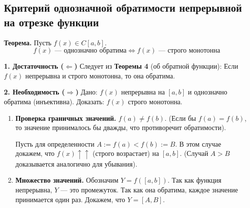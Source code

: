 \subsection{Критерий однозначной обратимости непрерывной на отрезке функции}

\textbf{Теорема.} Пусть $f(x) \in C[a, b]$.
\[ f(x) \text{ — однозначно обратима} \iff f(x) \text{ — строго монотонна} \]

\begin{tcolorbox}[title=Доказательство]
    \textbf{1. Достаточность ($\Leftarrow$)}
    Следует из \textbf{Теоремы 4} (об обратной функции):
    Если $f(x)$ непрерывна и строго монотонна, то она обратима.

    \textbf{2. Необходимость ($\Rightarrow$)}
    Дано: $f(x)$ непрерывна на $[a, b]$ и однозначно обратима (инъективна).
    Доказать: $f(x)$ строго монотонна.

    \begin{enumerate}
        \item \textbf{Проверка граничных значений.}
        $f(a) \neq f(b)$. (Если бы $f(a) = f(b)$, то значение принималось бы дважды, что противоречит обратимости).
        
        Пусть для определенности $A := f(a) < f(b) := B$.
        В этом случае докажем, что $f(x) \uparrow\uparrow$ (строго возрастает) на $[a, b]$.
        (Случай $A > B$ доказывается аналогично для убывания).

        \item \textbf{Множество значений.}
        Обозначим $Y = f([a, b])$.
        Так как функция непрерывна, $Y$ — это промежуток. Так как она обратима, каждое значение принимается один раз.
        Докажем, что $Y = [A, B]$.
        
	\begin{center}
\end{center}
\end{enumerate}
\end{tcolorbox}

